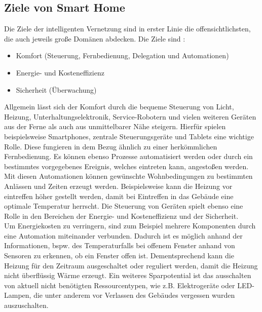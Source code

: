     \subsection{Ziele von Smart Home} %
    \label{subsec:ziele_sh}
        Die Ziele der intelligenten Vernetzung sind in erster Linie die offensichtlichsten, die auch jeweils 
        große Domänen abdecken. Die Ziele sind \cite{goals-smarthome}:
        \begin{itemize}
            \item Komfort (Steuerung, Fernbedienung, Delegation und Automationen)
            \item Energie- und Kosteneffizienz
            \item Sicherheit (Überwachung)
        \end{itemize}
        Allgemein lässt sich der Komfort durch die bequeme Steuerung von Licht, Heizung, Unterhaltungselektronik, 
        Service-Robotern und vielen weiteren Geräten aus der Ferne als auch aus unmittelbarer Nähe steigern. 
        Hierfür spielen beispielsweise Smartphones, zentrale Steuerungsgeräte und Tablets eine wichtige Rolle. 
        Diese fungieren in dem Bezug ähnlich zu einer herkömmlichen Fernbedienung. Es können ebenso Prozesse 
        automatisiert werden oder durch ein bestimmtes vorgegebenes Ereignis, welches 
        eintreten kann, angestoßen werden. Mit diesen Automationen können gewünschte Wohnbedingungen zu 
        bestimmten Anlässen und Zeiten erzeugt werden. Beispielsweise kann die Heizung vor eintreffen höher 
        gestellt werden, damit bei Eintreffen in das Gebäude eine optimale Temperatur herrscht. Die Steuerung von 
        Geräten spielt ebenso eine Rolle in den Bereichen der Energie- und Kosteneffizienz und der Sicherheit. 
        \\
        \linebreak
        Um Energiekosten zu verringern, sind zum Beispiel mehrere Komponenten durch eine Automation miteinander 
        verbunden. Dadurch ist es möglich anhand der Informationen, bspw. des Temperaturfalls bei offenem Fenster 
        anhand von Sensoren zu erkennen, ob ein Fenster offen ist. Dementsprechend kann die Heizung für den Zeitraum 
        ausgeschaltet oder reguliert werden, damit die Heizung nicht überflüssig Wärme erzeugt. Ein weiteres 
        Sparpotential ist das ausschalten von aktuell nicht benötigten Ressourcentypen, wie z.B. Elektrogeräte 
        oder LED-Lampen, die unter anderem vor Verlassen des Gebäudes vergessen wurden auszuschalten.
